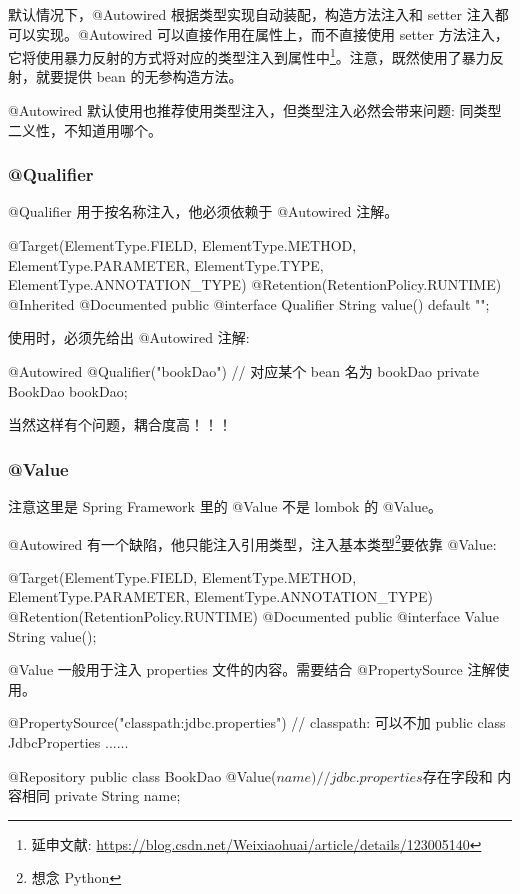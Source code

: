 默认情况下，@Autowired 根据类型实现自动装配，构造方法注入和 setter 注入都可以实现。@Autowired 可以直接作用在属性上，而不直接使用 setter 方法注入，它将使用暴力反射的方式将对应的类型注入到属性中\footnote{延申文献: \url{https://blog.csdn.net/Weixiaohuai/article/details/123005140}}。注意，既然使用了暴力反射，就要提供 bean 的无参构造方法。

@Autowired 默认使用也推荐使用类型注入，但类型注入必然会带来问题: 同类型二义性，不知道用哪个。

\subsubsection{@Qualifier}

@Qualifier 用于按名称注入，他必须依赖于 @Autowired 注解。

\begin{Java}
@Target({ElementType.FIELD, ElementType.METHOD, ElementType.PARAMETER, ElementType.TYPE, ElementType.ANNOTATION_TYPE})
@Retention(RetentionPolicy.RUNTIME)
@Inherited
@Documented
public @interface Qualifier {
    String value() default "";
}
\end{Java}

使用时，必须先给出 @Autowired 注解:

\begin{Java}
@Autowired
@Qualifier("bookDao")   // 对应某个 bean 名为 bookDao
private BookDao bookDao;
\end{Java}

当然这样有个问题，耦合度高！！！

\subsubsection{@Value}

注意这里是 Spring Framework 里的 @Value 不是 lombok 的 @Value。

@Autowired 有一个缺陷，他只能注入引用类型，注入基本类型\footnote{想念 Python}要依靠 @Value:

\begin{Java}
@Target({ElementType.FIELD, ElementType.METHOD, ElementType.PARAMETER, ElementType.ANNOTATION_TYPE})
@Retention(RetentionPolicy.RUNTIME)
@Documented
public @interface Value {
    String value();
}
\end{Java}

@Value 一般用于注入 properties 文件的内容。需要结合 @PropertySource 注解使用。

\begin{Java}
@PropertySource("classpath:jdbc.properties")    // classpath: 可以不加
public class JdbcProperties {
    ......
}

@Repository
public class BookDao {
    @Value(${name})     // jdbc.properties 存在字段和 ${} 内容相同
    private String name;
}
\end{Java}

\newpage